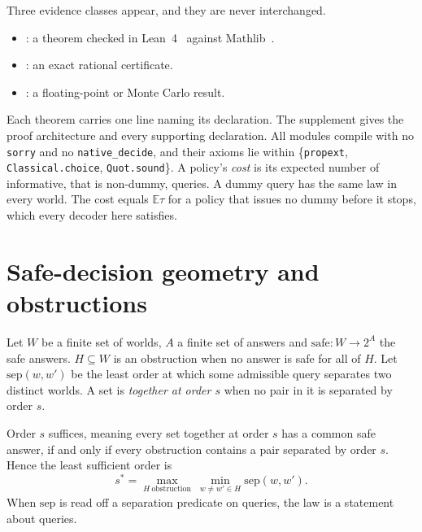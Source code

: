 Three evidence classes appear, and they are never interchanged.
\begin{itemize}
\item \PROVED: a theorem checked in Lean~4~\cite{demoura2021} against Mathlib~\cite{mathlib2020}.
\item \CERT: an exact rational certificate.
\item \NUM: a floating-point or Monte Carlo result.
\end{itemize}
Each theorem carries one line naming its declaration. The supplement gives the proof
architecture and every supporting declaration. All modules compile with no \texttt{sorry} and no
\texttt{native\_decide}, and their axioms lie within \{\texttt{propext}, \texttt{Classical.choice},
\texttt{Quot.sound}\}. A policy's \emph{cost} is its expected number of informative, that is
non-dummy, queries. A dummy query has the same law in every world. The cost equals
$\mathbb{E}\tau$ for a policy that issues no dummy before it stops, which every decoder here
satisfies.

\section{Safe-decision geometry and obstructions}
\label{sec:geometry}

Let $W$ be a finite set of worlds, $A$ a finite set of answers and
$\mathrm{safe}:W\to 2^{A}$ the safe answers. $H\subseteq W$ is an obstruction when no answer is
safe for all of $H$. Let $\mathrm{sep}(w,w')$ be the least order at which some admissible query
separates two distinct worlds. A set is \emph{together at order $s$} when no pair in it is
separated by order $s$.

\begin{theorem}
\label{thm:safelaw}
Order $s$ suffices, meaning every set together at order $s$ has a common safe answer, if and
only if every obstruction contains a pair separated by order $s$. Hence the least sufficient
order is
\[
s^{*}=\max_{H\ \text{obstruction}}\ \min_{w\ne w'\in H}\mathrm{sep}(w,w').
\]
When $\mathrm{sep}$ is read off a separation predicate on queries, the law is a statement about
queries.
\end{theorem}


